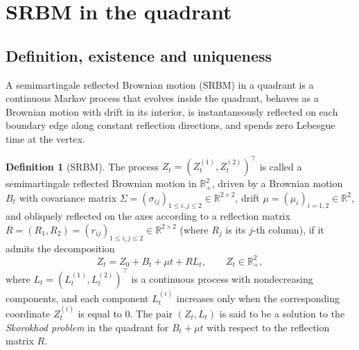 \documentclass[11pt]{article}
\newcommand{\Rp}{\mathbb{R}_+}
\theoremstyle{definition}
\newtheorem{deffr}[thm]{Definition}
\begin{document}
\section{SRBM in the quadrant}
\label{sec:SRBM}

\subsection{Definition, existence and uniqueness}

A semimartingale reflected Brownian motion (SRBM) in a quadrant is a continuous Markov process that evolves inside the quadrant, behaves as a Brownian motion with drift in its interior, is instantaneously reflected on each boundary edge along constant reflection directions, and spends zero Lebesgue time at the vertex.
\begin{deffr}[SRBM]
\label{intro:def:MBsemimartingale}
The process $Z_t=(Z_t^{(1)},Z_t^{(2)})^\top$ is called a semimartingale reflected Brownian motion in $\Rp^2$, driven by a Brownian motion $B_t$ with covariance matrix $\Sigma=(\sigma_{ij})_{1 \le i,j \le 2}\in\mathbb{R}^{2\times 2}$, drift $\mu=(\mu_i)_{i=1,2}\in\mathbb{R}^2$, and obliquely reflected on the axes according to a reflection matrix $R=(R_1,R_2)=(r_{ij})_{1 \le i,j \le 2}\in\mathbb{R}^{2\times 2}$ (where $R_j$ is its $j$-th column), if it admits the decomposition
\begin{equation}\label{eq:srbm}
Z_t = Z_0 + B_t + \mu t + R L_t, \qquad Z_t \in \Rp^2,
\end{equation}
where $L_t=(L_t^{(1)},L_t^{(2)})^\top$ is a continuous process with nondecreasing components, and each component $L_t^{(i)}$ increases only when the corresponding coordinate $Z_t^{(i)}$ is equal to $0$. The pair $(Z_t,L_t)$ is said to be a solution to the \textit{Skorokhod problem} in the quadrant for $B_t+\mu t$ with respect to the reflection matrix $R$. 
\end{deffr}
\end{document}

